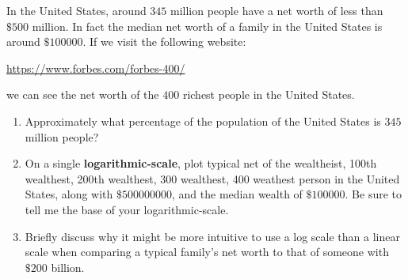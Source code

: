 \documentclass[noauthor,nooutcomes,handout,hints,12pt]{ximera}
\begin{document}
\begin{question}
In the United States, around $345$ million people have a net worth of less than $\$500$ million. In fact the median net worth of a family in the United States is around $\$100000$. 
 If we visit the following website:
\begin{center}
        \url{https://www.forbes.com/forbes-400/}
    \end{center}
    we can see the net worth of the $400$ richest people in the United States.
    \begin{enumerate}
        \item Approximately what percentage of the population of the United States is $345$ million people?
        \item On a single \textbf{logarithmic-scale}, plot typical net of the wealtheist, 100th wealthest, 200th wealthest, 300 wealthest, 
        400 weathest person in the United States, along with $\$500000000$, and the median wealth of $\$100000$. Be sure to tell me the base of your logarithmic-scale.
              \begin{center}
                \end{center}
        \item Briefly discuss why it might be more intuitive to use a log scale
              than a linear scale when comparing a typical family's net worth
              to
              that of someone with \(\$200\) billion.
    \end{enumerate}

\end{question}
\end{document}
